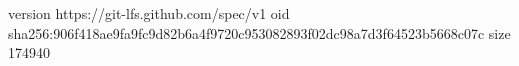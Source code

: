 version https://git-lfs.github.com/spec/v1
oid sha256:906f418ae9fa9fc9d82b6a4f9720c953082893f02dc98a7d3f64523b5668c07c
size 174940
